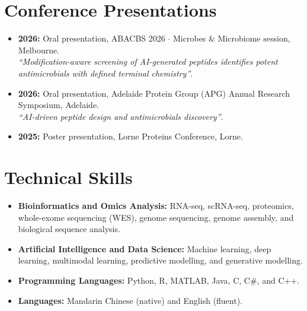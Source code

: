 \documentclass[10pt,a4paper]{article}
\begin{document}
\section{Conference Presentations}
\begin{itemize}
  \item \textbf{2026:} Oral presentation, ABACBS 2026 $\cdot$ Microbes \& Microbiome session, Melbourne. \\
  \textit{``Modification-aware screening of AI-generated peptides identifies potent antimicrobials with defined terminal chemistry''}.
  \item \textbf{2026:} Oral presentation, Adelaide Protein Group (APG) Annual Research Symposium, Adelaide. \\
  \textit{``AI-driven peptide design and antimicrobials discovery''}.
  \item \textbf{2025:} Poster presentation, Lorne Proteins Conference, Lorne.
\end{itemize}

\section{Technical Skills}
\begin{itemize}
  \item \textbf{Bioinformatics and Omics Analysis:}
  RNA-seq, scRNA-seq, proteomics, whole-exome sequencing (WES),
  genome sequencing, genome assembly, and biological sequence analysis.

  \item \textbf{Artificial Intelligence and Data Science:}
  Machine learning, deep learning, multimodal learning,
  predictive modelling, and generative modelling.

  \item \textbf{Programming Languages:}
  Python, R, MATLAB, Java, C, C\#, and C++.

  \item \textbf{Languages:}
  Mandarin Chinese (native) and English (fluent).
\end{itemize}

\ifdefined{}
\end{document}

